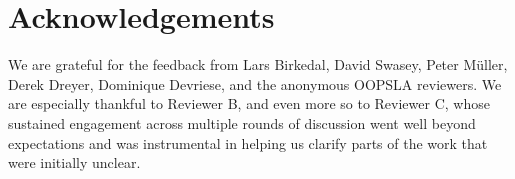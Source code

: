  \section*{Acknowledgements}
We are grateful for the feedback from Lars Birkedal, David Swasey, Peter Müller, Derek Dreyer, Dominique Devriese, and the anonymous OOPSLA reviewers. 
We are especially thankful to Reviewer B, and even more so to Reviewer C, whose %
 sustained engagement across multiple rounds of discussion went well beyond %
 expectations and was instrumental in helping us clarify parts of the work that were initially unclear.
 